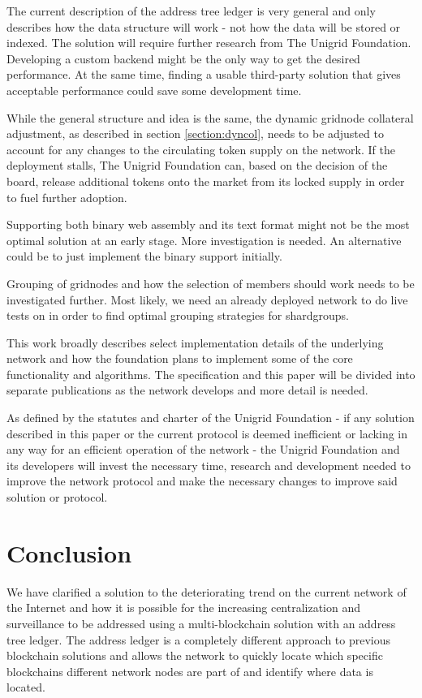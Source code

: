 \documentclass[10pt,a4paper,final]{article}
\begin{document}
The current description of the address tree ledger is very general and only describes how the data structure will work - not how the data will be stored or indexed. The solution will require further research from The Unigrid Foundation. Developing a custom backend might be the only way to get the desired performance. At the same time, finding a usable third-party solution that gives acceptable performance could save some development time.

While the general structure and idea is the same, the dynamic \gls{gridnode} collateral adjustment, as described in section \ref{section:dyncol}, needs to be adjusted to account for any changes to the circulating token supply on the network. If the deployment stalls, The Unigrid Foundation can, based on the decision of the board, release additional tokens onto the market from its locked supply in order to fuel further adoption.

Supporting both binary web assembly and its text format might not be the most optimal solution at an early stage. More investigation is needed. An alternative could be to just implement the binary support initially.

Grouping of \glspl{gridnode} and how the selection of members should work needs to be investigated further. Most likely, we need an already deployed network to do live tests on in order to find optimal grouping strategies for \glspl{shardgroup}.

This work broadly describes select implementation details of the underlying network and how the foundation plans to implement some of the core functionality and algorithms. The specification and this paper will be divided into separate publications as the network develops and more detail is needed.

As defined by the statutes \cite{unigridstatutes} and charter \cite{unigridcharter} of the Unigrid Foundation - if any solution described in this paper or the current protocol is deemed inefficient or lacking in any way for an efficient operation of the network - the Unigrid Foundation and its developers will invest the necessary time, research and development needed to improve the network protocol and make the necessary changes to improve said solution or protocol.

\section{Conclusion}
We have clarified a solution to the deteriorating trend on the current network of the Internet and how it is possible for the increasing centralization and surveillance to be addressed using a multi-blockchain solution with an address tree ledger. The address ledger is a completely different approach to previous blockchain solutions and allows the network to quickly locate which specific blockchains different network nodes are part of and identify where data is located.
\end{document}

